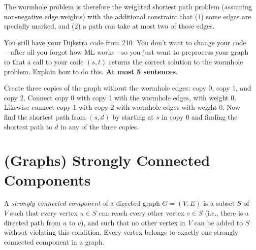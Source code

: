 \begin{problem}
The wormhole problem is therefore the weighted shortest path problem
(assuming non-negative edge weights) with the additional constraint
that (1) some edges are specially marked, and (2) a path can take at
most two of those edges.

\ask
You still have your Dijkstra code from 210.  You don't want to change
your code---after all you forgot how ML works---so you just want to
preprocess your graph so that a call to your code $(s,t)$
returns the correct solution to the wormhole problem.  Explain how to
do this. \textbf{At most 5 sentences.}

\sol
Create three copies of the graph without the wormhole edges: copy 0,
copy 1, and copy 2.  Connect copy 0 with copy 1 with the wormhole
edges, with weight 0.  Likewise connect copy 1 with copy 2 with
wormhole edges with weight 0.  Now find the shortest path from
$(s,d)$ by starting at $s$ in copy 0 and finding the shortest
path to $d$ in any of the three copies.
\end{problem}



\section{(Graphs) Strongly Connected Components}

%

A \emph{strongly connected component} of a directed graph $G = (V,E)$ is a subset $S$ of $V$ such
that every vertex $u \in S$ can reach every other vertex $v \in S$ (i.e.,
there is a directed path from $u$ to $v$), and such that no other vertex in
$V$ can be added to $S$ without violating this condition. Every vertex
belongs to exactly one strongly connected component in a graph.

